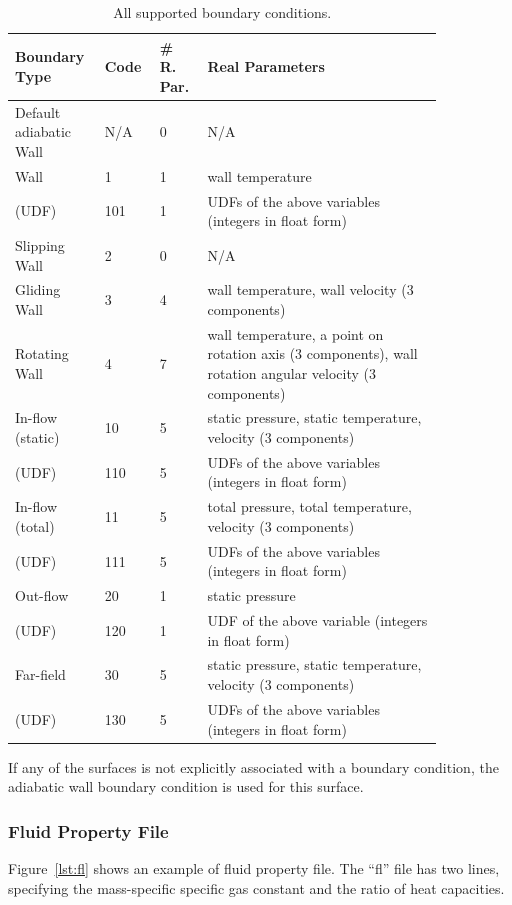 \documentclass[]{article}
\begin{document}
\begin{table}
\caption{All supported boundary conditions.}
  \begin{tabular}{p{0.15\linewidth}p{0.1\linewidth}p{0.1\linewidth}p{0.5\linewidth}}
    \hline
    Boundary Type & Code & \# R. Par. & Real Parameters \\
    \hline
    Default adiabatic Wall & N/A & 0 & N/A \\  
    Wall & 1 & 1 & wall temperature \\
    (UDF) & 101 & 1 & UDFs of the above variables (integers in float form) \\
    Slipping Wall & 2 & 0 & N/A \\
    Gliding Wall & 3 & 4 & wall temperature, wall velocity (3 components) \\
    Rotating Wall & 4 & 7 & wall temperature, a point on rotation axis (3 components),
      wall rotation angular velocity (3 components) \\
    In-flow (static) & 10 & 5 &
      static pressure, static temperature, velocity (3 components) \\
    (UDF) & 110 & 5 & UDFs of the above variables (integers in float form) \\
    In-flow (total) & 11 & 5 &
      total pressure, total temperature, velocity (3 components) \\
    (UDF) & 111 & 5 & UDFs of the above variables (integers in float form) \\
    Out-flow & 20 & 1 & static pressure \\
    (UDF) & 120 & 1 & UDF of the above variable (integers in float form) \\
    Far-field & 30 & 5 &
      static pressure, static temperature, velocity (3 components) \\
    (UDF) & 130 & 5 & UDFs of the above variables (integers in float form) \\
    \hline
  \end{tabular}
  \label{tab:bc}
\end{table}

If any of the surfaces is not explicitly associated with a boundary condition, the adiabatic wall
boundary condition is used for this surface.

\subsubsection{Fluid Property File}

Figure~\ref{lst:fl} shows an example of fluid property file.
The ``fl'' file has two lines, specifying the mass-specific specific gas constant and the ratio of
heat capacities.
\end{document}
